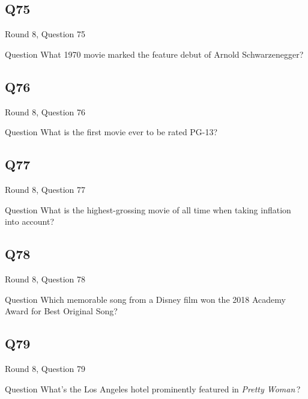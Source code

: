 \documentclass[11pt]{beamer}
\begin{document}
\subsection*{Q75}
\begin{frame}[t]{Round 8, Question 75}
\vspace{2em}
\begin{block}{Question}
What 1970 movie marked the feature debut of Arnold Schwarzenegger?
\end{block}
\end{frame}
    

\subsection*{Q76}
\begin{frame}[t]{Round 8, Question 76}
\vspace{2em}
\begin{block}{Question}
What is the first movie ever to be rated PG-13?
\end{block}
\end{frame}
    

\subsection*{Q77}
\begin{frame}[t]{Round 8, Question 77}
\vspace{2em}
\begin{block}{Question}
What is the highest-grossing movie of all time when taking inflation into account?
\end{block}
\end{frame}
    

\subsection*{Q78}
\begin{frame}[t]{Round 8, Question 78}
\vspace{2em}
\begin{block}{Question}
Which memorable song from a Disney film won the 2018 Academy Award for Best Original Song?
\end{block}
\end{frame}
    

\subsection*{Q79}
\begin{frame}[t]{Round 8, Question 79}
\vspace{2em}
\begin{block}{Question}
What's the Los Angeles hotel prominently featured in \emph{Pretty Woman}\,?
\end{block}
\end{frame}
    
\end{document}
